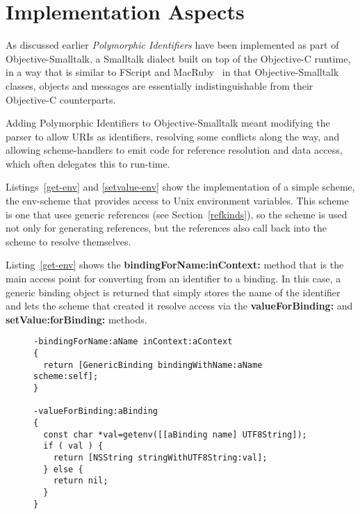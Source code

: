 \documentclass[preprint]{sigplanconf}
\begin{document}


\section{Implementation Aspects}
\label{implementation}

As discussed earlier \emph{Polymorphic Identifiers} have been implemented as part of Objective-Smalltalk,
a Smalltalk dialect built on top of the Objective-C\cite{objc-evol}\cite{objc-apple} runtime, 
in a way that is similar to FScript\cite{fscript} and MacRuby~\cite{macruby} in that Objective-Smalltalk classes,
objects and messages are essentially indistinguishable from their Objective-C counterparts.

Adding Polymorphic Identifiers to Objective-Smalltalk meant modifying the parser to allow URIs as identifiers,
resolving some conflicts along the way,
and allowing scheme-handlers to emit code for reference resolution and data access, which often
delegates this to run-time.



Listings~\ref{get-env} and \ref{setvalue-env} show the implementation of a simple scheme,
the env-scheme that provides access to Unix environment variables.  This scheme is
one that uses generic references (see Section~\ref{refkinds}), so the scheme is used
not only for generating references, but the references also call back into the scheme
to resolve themselves.

Listing~\ref{get-env} 
shows the {\bf bindingForName:inContext:} method that is the main access point for
converting from an identifier to a binding.  In this case, a generic binding object is returned
that simply stores the name of the identifier and lets the scheme that created it resolve
access via the {\bf valueForBinding:} and {\bf setValue:forBinding:} methods.


\begin{figure}[htbp]
\begin{lstlisting}[style=numbers,label=get-env,caption=Basic lookup in env: scheme.]
-bindingForName:aName inContext:aContext
{
  return [GenericBinding bindingWithName:aName scheme:self];
}

-valueForBinding:aBinding
{
  const char *val=getenv([[aBinding name] UTF8String]);
  if ( val ) {
    return [NSString stringWithUTF8String:val];
  } else {
    return nil;
  }
}
\end{lstlisting}
\end{figure}
\end{document}
